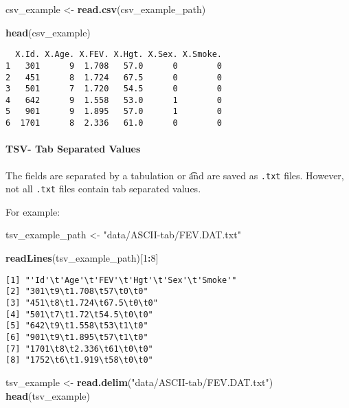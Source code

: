 \documentclass[12pt,]{article}
\newenvironment{Shaded}{\begin{snugshade}}{\end{snugshade}}
\newcommand{\DecValTok}[1]{\textcolor[rgb]{0.00,0.00,0.81}{#1}}
\newcommand{\KeywordTok}[1]{\textcolor[rgb]{0.13,0.29,0.53}{\textbf{#1}}}
\newcommand{\NormalTok}[1]{#1}
\newcommand{\OperatorTok}[1]{\textcolor[rgb]{0.81,0.36,0.00}{\textbf{#1}}}
\newcommand{\StringTok}[1]{\textcolor[rgb]{0.31,0.60,0.02}{#1}}
\let\oldparagraph\paragraph
\renewcommand{\paragraph}[1]{\oldparagraph{#1}\mbox{}}
\begin{document}
\begin{Shaded}
\begin{Highlighting}[]
\NormalTok{csv_example <-}\StringTok{ }\KeywordTok{read.csv}\NormalTok{(csv_example_path)}

\KeywordTok{head}\NormalTok{(csv_example)}
\end{Highlighting}
\end{Shaded}

\begin{verbatim}
  X.Id. X.Age. X.FEV. X.Hgt. X.Sex. X.Smoke.
1   301      9  1.708   57.0      0        0
2   451      8  1.724   67.5      0        0
3   501      7  1.720   54.5      0        0
4   642      9  1.558   53.0      1        0
5   901      9  1.895   57.0      1        0
6  1701      8  2.336   61.0      0        0
\end{verbatim}

\hypertarget{tsv--tab-separated-values}{%
\paragraph{TSV- Tab Separated Values}\label{tsv--tab-separated-values}}

The fields are separated by a tabulation or \t and are saved as
\texttt{.txt} files. However, not all \texttt{.txt} files contain tab
separated values.

For example:

\begin{Shaded}
\begin{Highlighting}[]
\NormalTok{tsv_example_path <-}\StringTok{ "data/ASCII-tab/FEV.DAT.txt"}

\KeywordTok{readLines}\NormalTok{(tsv_example_path)[}\DecValTok{1}\OperatorTok{:}\DecValTok{8}\NormalTok{]}
\end{Highlighting}
\end{Shaded}

\begin{verbatim}
[1] "'Id'\t'Age'\t'FEV'\t'Hgt'\t'Sex'\t'Smoke'"
[2] "301\t9\t1.708\t57\t0\t0"                  
[3] "451\t8\t1.724\t67.5\t0\t0"                
[4] "501\t7\t1.72\t54.5\t0\t0"                 
[5] "642\t9\t1.558\t53\t1\t0"                  
[6] "901\t9\t1.895\t57\t1\t0"                  
[7] "1701\t8\t2.336\t61\t0\t0"                 
[8] "1752\t6\t1.919\t58\t0\t0"                 
\end{verbatim}

\begin{Shaded}
\begin{Highlighting}[]
\NormalTok{tsv_example <-}\StringTok{ }\KeywordTok{read.delim}\NormalTok{(}\StringTok{"data/ASCII-tab/FEV.DAT.txt"}\NormalTok{)}
\KeywordTok{head}\NormalTok{(tsv_example)}
\end{Highlighting}
\end{Shaded}
\end{document}
